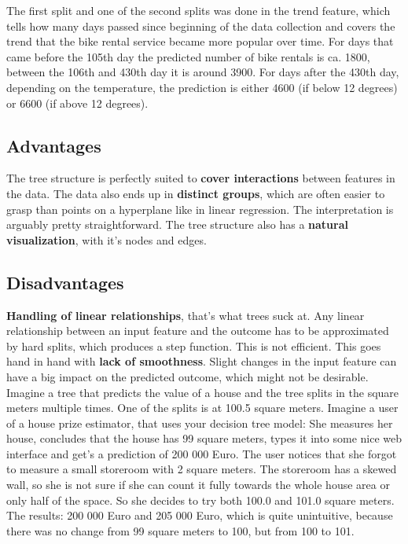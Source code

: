 \documentclass[12pt,]{krantz}
\theoremstyle{definition}
\theoremstyle{definition}
\theoremstyle{definition}
\theoremstyle{remark}
\begin{document}
The first split and one of the second splits was done in the trend
feature, which tells how many days passed since beginning of the data
collection and covers the trend that the bike rental service became more
popular over time. For days that came before the 105th day the predicted
number of bike rentals is ca. 1800, between the 106th and 430th day it
is around 3900. For days after the 430th day, depending on the
temperature, the prediction is either 4600 (if below 12 degrees) or 6600
(if above 12 degrees).

\subsection{Advantages}\label{advantages}

The tree structure is perfectly suited to \textbf{cover interactions}
between features in the data. The data also ends up in \textbf{distinct
groups}, which are often easier to grasp than points on a hyperplane
like in linear regression. The interpretation is arguably pretty
straightforward. The tree structure also has a \textbf{natural
visualization}, with it's nodes and edges.

\subsection{Disadvantages}\label{disadvantages}

\textbf{Handling of linear relationships}, that's what trees suck at.
Any linear relationship between an input feature and the outcome has to
be approximated by hard splits, which produces a step function. This is
not efficient. This goes hand in hand with \textbf{lack of smoothness}.
Slight changes in the input feature can have a big impact on the
predicted outcome, which might not be desirable. Imagine a tree that
predicts the value of a house and the tree splits in the square meters
multiple times. One of the splits is at 100.5 square meters. Imagine a
user of a house prize estimator, that uses your decision tree model: She
measures her house, concludes that the house has 99 square meters, types
it into some nice web interface and get's a prediction of 200 000 Euro.
The user notices that she forgot to measure a small storeroom with 2
square meters. The storeroom has a skewed wall, so she is not sure if
she can count it fully towards the whole house area or only half of the
space. So she decides to try both 100.0 and 101.0 square meters. The
results: 200 000 Euro and 205 000 Euro, which is quite unintuitive,
because there was no change from 99 square meters to 100, but from 100
to 101.
\end{document}
